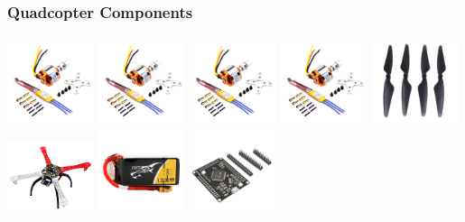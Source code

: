 \documentclass{beamer}
\begin{document}
\begin{frame}
\frametitle{Quadcopter Components}
\begin{center}
\includegraphics[width=1in]{../src/im/motor_esc}
\includegraphics[width=1in]{../src/im/motor_esc}
\includegraphics[width=1in]{../src/im/motor_esc}
\includegraphics[width=1in]{../src/im/motor_esc}
\break
\includegraphics[width=1in]{../src/im/propeller}
\includegraphics[width=1in]{../src/im/chassis}
\includegraphics[width=1in]{../src/im/battery}
\break
\includegraphics[width=1in]{../src/im/dev_board}

\end{center}
\end{frame}
\end{document}
